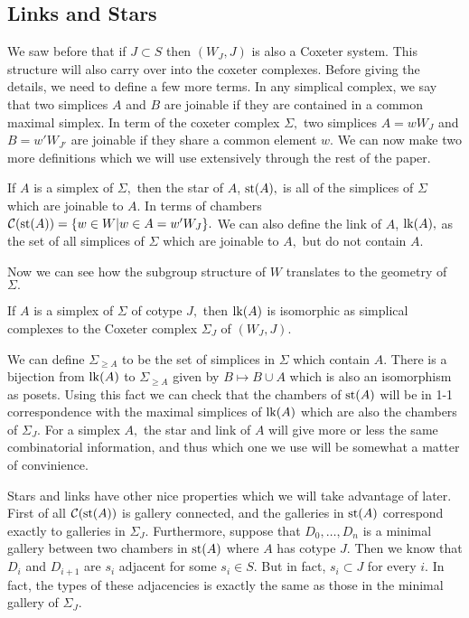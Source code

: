 \documentclass[class=book, crop=false,12 pt]{standalone}
\begin{document}
\subsection{Links and Stars}
We saw before that if $J\subset S$ then $(W_J,J)$ is also a Coxeter system. This structure will also carry over into the coxeter complexes. Before giving the details, we need to define a few more terms. In any simplical complex, we say that two simplices $A$ and $B$ are joinable if they are contained in a common maximal simplex. In term of the coxeter complex $\Sigma,$ two simplices $A=wW_J$ and $B=w'W_{J'}$ are joinable if they share a common element $w.$ We can now make two more definitions which we will use extensively through the rest of the paper.

\begin{defn}
	If $A$ is a simplex of $\Sigma,$ then the star of $A$, $\mathrm{st}(A),$ is all of the simplices of $\Sigma$ which are joinable to $A.$ In terms of chambers $\mathcal{C}(\mathrm{st}(A))=\{w\in W|w\in A=w'W_J\}.$ We can also define the link of $A$, $\mathrm{lk}(A),$ as the set of all simplices of $\Sigma$ which are joinable to $A,$ but do not contain $A.$
\end{defn}

Now we can see how the subgroup structure of $W$ translates to the geometry of $\Sigma.$
\begin{prop}
	\label{prop:link}
	If $A$ is a simplex of $\Sigma$ of cotype $J,$ then $\mathrm{lk}(A)$ is isomorphic as simplical complexes to the Coxeter complex $\Sigma_J$ of $(W_J,J).$
\end{prop}

We can define $\Sigma_{\ge A}$ to be the set of simplices in $\Sigma$ which contain $A.$ There is a bijection from $\mathrm{lk}(A)$ to $\Sigma_{\ge A}$ given by $B\mapsto B\cup A$ which is also an isomorphism as posets. Using this fact we can check that the chambers of $\mathrm{st}(A)$ will be in 1-1 correspondence with the maximal simplices of $\mathrm{lk}(A)$ which are also the chambers of $\Sigma_J.$ For a simplex $A,$ the star and link of $A$ will give more or less the same combinatorial information, and thus which one we use will be somewhat a matter of convinience.

Stars and links have other nice properties which we will take advantage of later. First of all $\mathcal{C}(\mathrm{st}(A))$ is gallery connected, and the galleries in $\mathrm{st}(A)$ correspond exactly to galleries in $\Sigma_J.$ Furthermore, suppose that $D_0,\dots,D_n$ is a minimal gallery between two chambers in $\mathrm{st}(A)$ where $A$ has cotype $J.$ Then we know that $D_i$ and $D_{i+1}$ are $s_i$ adjacent for some $s_i\in S.$ But in fact, $s_i\subset J$ for every $i.$ In fact, the types of these adjacencies is exactly the same as those in the minimal gallery of $\Sigma_J.$ 
\end{document}
